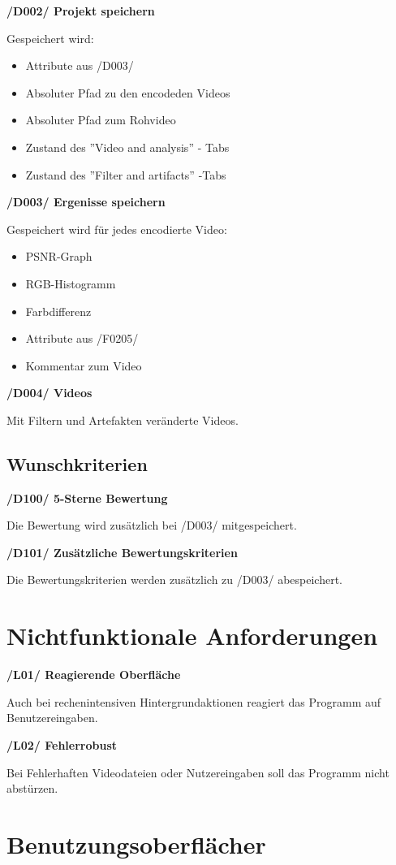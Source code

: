 \documentclass[parskip=full]{scrartcl}
\begin{document}
\textbf{/D002/ Projekt speichern}

Gespeichert wird:
\begin{itemize}
\item Attribute aus /D003/
\item Absoluter Pfad zu den encodeden Videos
\item Absoluter Pfad zum Rohvideo
\item Zustand des ''Video and analysis'' - Tabs
\item Zustand des ''Filter and artifacts'' -Tabs
\end{itemize}

\textbf{/D003/ Ergenisse speichern}

Gespeichert wird für jedes encodierte Video:
\begin{itemize}
\item PSNR-Graph
\item RGB-Histogramm
\item Farbdifferenz
\item Attribute aus /F0205/
\item Kommentar zum Video
\end{itemize}

\textbf{/D004/ Videos}

Mit Filtern und Artefakten veränderte Videos.

\subsection{Wunschkriterien}
\textbf{/D100/ 5-Sterne Bewertung}

Die Bewertung wird zusätzlich bei /D003/ mitgespeichert.

\textbf{/D101/ Zusätzliche Bewertungskriterien}

Die Bewertungskriterien werden zusätzlich zu /D003/ abespeichert.


\newpage
\section{Nichtfunktionale Anforderungen}
\textbf{/L01/ Reagierende Oberfläche}

Auch bei rechenintensiven Hintergrundaktionen reagiert das Programm auf Benutzereingaben.

\textbf{/L02/ Fehlerrobust}

Bei Fehlerhaften Videodateien oder Nutzereingaben soll das Programm nicht abstürzen.
\newpage
\section{Benutzungsoberflächer}
\end{document}
